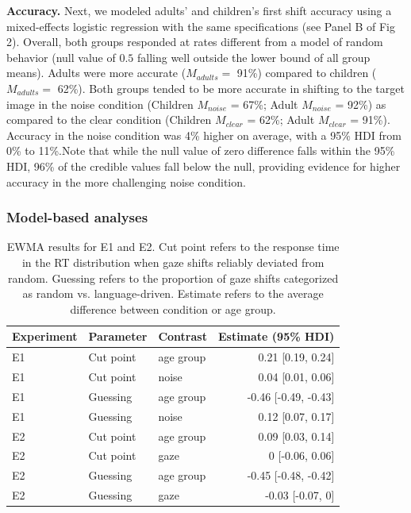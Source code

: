 \documentclass[10pt, letterpaper]{article}
\begin{document}
\textbf{Accuracy.} Next, we modeled adults' and children's first shift
accuracy using a mixed-effects logistic regression with the same
specifications (see Panel B of Fig 2). Overall, both groups responded at
rates different from a model of random behavior (null value of \(0.5\)
falling well outside the lower bound of all group means). Adults were
more accurate (\(M_{adults} =\) 91\%) compared to children
(\(M_{adults} =\) 62\%). Both groups tended to be more accurate in
shifting to the target image in the noise condition (Children
\(M_{noise}\) = 67\%; Adult \(M_{noise}\) = 92\%) as compared to the
clear condition (Children \(M_{clear}\) = 62\%; Adult \(M_{clear}\) =
91\%). Accuracy in the noise condition was 4\% higher on average, with a
95\% HDI from 0\% to 11\%.Note that while the null value of zero
difference falls within the 95\% HDI, 96\% of the credible values fall
below the null, providing evidence for higher accuracy in the more
challenging noise condition.

\subsubsection{Model-based analyses}\label{model-based-analyses}

\begin{table}[b]
\centering
\begin{tabular}{lllr}
  \hline
Experiment & Parameter & Contrast & Estimate (95\% HDI) \\ 
  \hline
E1 & Cut point & age group & 0.21 [0.19, 0.24] \\ 
  E1 & Cut point & noise & 0.04 [0.01, 0.06] \\ 
  E1 & Guessing & age group & -0.46 [-0.49, -0.43] \\ 
  E1 & Guessing & noise & 0.12 [0.07, 0.17] \\ 
   \hline
E2 & Cut point & age group & 0.09 [0.03, 0.14] \\ 
  E2 & Cut point & gaze & 0 [-0.06, 0.06] \\ 
  E2 & Guessing & age group & -0.45 [-0.48, -0.42] \\ 
  E2 & Guessing & gaze & -0.03 [-0.07, 0] \\ 
   \hline
\end{tabular}
\caption{EWMA results for E1 and E2. Cut point refers to the response time in the RT distribution when gaze shifts reliably deviated from random. Guessing refers to the proportion of gaze shifts categorized as random vs. language-driven. Estimate refers to the average difference between condition or age group.} 
\end{table}
\end{document}
